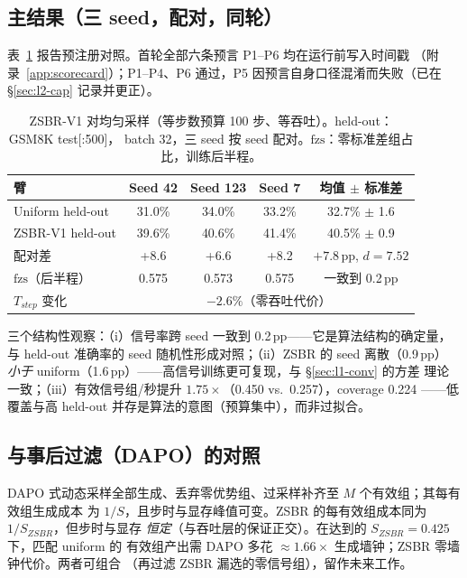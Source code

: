 \documentclass[11pt]{article}
\theoremstyle{definition}
\newcommand{\fzs}{\text{fzs}}
\begin{document}
\subsection{主结果（三 seed，配对，同轮）}\label{sec:l2-results}
表~\ref{tab:zsbr-main} 报告预注册对照。首轮全部六条预言 P1--P6 均在运行前写入时间戳
（附录~\ref{app:scorecard}）；P1--P4、P6 通过，P5 因预言自身口径混淆而失败（已在
\S\ref{sec:l2-cap} 记录并更正）。

\begin{table}[t]
\centering\small
\caption{ZSBR-V1 对均匀采样（等步数预算 100 步、等吞吐）。held-out：GSM8K test[:500]，
batch 32，三 seed 按 seed 配对。$\fzs$：零标准差组占比，训练后半程。}
\label{tab:zsbr-main}
\begin{tabular}{@{}lcccc@{}}
\toprule
臂 & Seed 42 & Seed 123 & Seed 7 & 均值 $\pm$ 标准差 \\
\midrule
Uniform held-out & 31.0\% & 34.0\% & 33.2\% & 32.7\% $\pm$ 1.6 \\
ZSBR-V1 held-out & 39.6\% & 40.6\% & 41.4\% & 40.5\% $\pm$ 0.9 \\
\midrule
配对差 & +8.6 & +6.6 & +8.2 & $+7.8$\,pp, $d{=}7.52$ \\
$\fzs$（后半程） & 0.575 & 0.573 & 0.575 & 一致到 0.2\,pp \\
$T_{step}$ 变化 & \multicolumn{4}{c}{$-2.6\%$（零吞吐代价）} \\
\bottomrule
\end{tabular}
\end{table}

三个结构性观察：（i）信号率跨 seed 一致到 0.2\,pp——它是算法结构的确定量，与
held-out 准确率的 seed 随机性形成对照；（ii）ZSBR 的 seed 离散（0.9\,pp）
\emph{小于} uniform（1.6\,pp）——高信号训练更可复现，与 \S\ref{sec:l1-conv} 的方差
理论一致；（iii）有效信号组/秒提升 $1.75\times$（0.450 vs.\ 0.257），coverage 0.224
——低覆盖与高 held-out 并存是算法的意图（预算集中），而非过拟合。

\subsection{与事后过滤（DAPO）的对照}\label{sec:l2-dapo}
DAPO 式动态采样全部生成、丢弃零优势组、过采样补齐至 $M$ 个有效组；其每有效组生成成本
为 $1/S$，且步时与显存峰值可变。ZSBR 的每有效组成本同为 $1/S_{ZSBR}$，但步时与显存
\emph{恒定}（与吞吐层的保证正交）。在达到的 $S_{ZSBR}{=}0.425$ 下，匹配 uniform 的
有效组产出需 DAPO 多花 ${\approx}1.66\times$ 生成墙钟；ZSBR 零墙钟代价。两者可组合
（再过滤 ZSBR 漏选的零信号组），留作未来工作。
\end{document}
